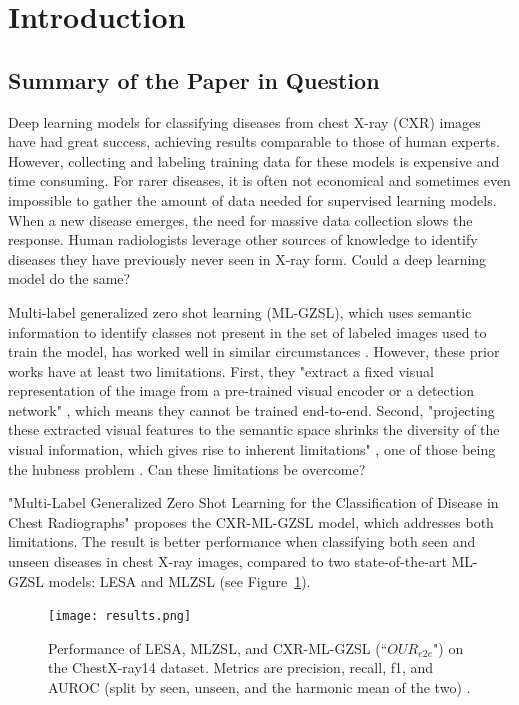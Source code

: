 \documentclass[letterpaper]{article} %
\begin{document}
\section{Introduction}

\subsection{Summary of the Paper in Question}

Deep learning models for classifying diseases from chest X-ray (CXR) images have had great success, achieving results comparable to those of human experts. However, collecting and labeling training data for these models is expensive and time consuming. For rarer diseases, it is often not economical and sometimes even impossible to gather the amount of data needed for supervised learning models. When a new disease emerges, the need for massive data collection slows the response. Human radiologists leverage other sources of knowledge to identify diseases they have previously never seen in X-ray form. Could a deep learning model do the same?

Multi-label generalized zero shot learning (ML-GZSL), which uses semantic information to identify classes not present in the set of labeled images used to train the model, has worked well in similar circumstances \cite{10.1109/TPAMI.2012.256, 10.1109/TMM.2019.2924511, 9157745}. However, these prior works have at least two limitations. First, they "extract a fixed visual representation of the image from a pre-trained visual encoder or a detection network" \cite{hayat2021multilabel}, which means they cannot be trained end-to-end. Second, "projecting these extracted visual features to the semantic space shrinks the diversity of the visual information, which gives rise to inherent limitations" \cite{hayat2021multilabel}, one of those being the hubness problem \cite{dinu2015improvingzeroshotlearningmitigating}. Can these limitations be overcome?

"Multi-Label Generalized Zero Shot Learning for the Classification of Disease in Chest Radiographs" \cite{hayat2021multilabel} proposes the CXR-ML-GZSL model, which addresses both limitations. The result is better performance when classifying both seen and unseen diseases in chest X-ray images, compared to two state-of-the-art ML-GZSL models: LESA \cite{9157745} and MLZSL \cite{lee2018multilabelzeroshotlearningstructured} (see Figure~\ref{fig:results}).

\begin{figure}[h!]
\centering
\texttt{[image: results.png]}
\caption{Performance of LESA, MLZSL, and CXR-ML-GZSL (``$OUR_{e2e}$") on the ChestX-ray14 dataset. Metrics are precision, recall, f1, and AUROC (split by seen, unseen, and the harmonic mean of the two) \cite{hayat2021multilabel}.}
\label{fig:results}
\end{figure}
\end{document}
